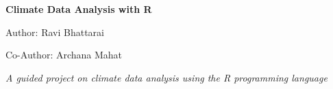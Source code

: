\documentclass[12pt,a4paper,openany]{book}
\begin{document}
\begin{titlepage}
    \centering
    \vspace*{5cm}
    
    {\Huge\bfseries Climate Data Analysis with R \par}
    \vspace{2cm}
    
    {\Large Author: Ravi Bhattarai \par}
    \vspace{0.5cm}
    {\Large Co-Author: Archana Mahat \par}
    \vspace{1cm}
    {\small\textit{A guided project on climate data analysis using the R programming language} \par}
    
    \vspace{2cm}
\end{titlepage}


\tableofcontents
















\end{document}
